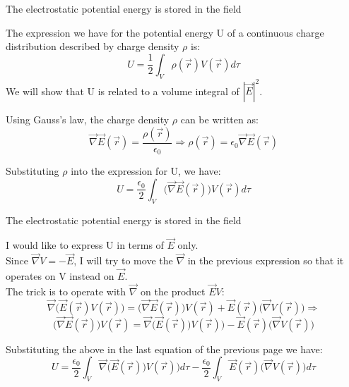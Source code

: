 \begin{frame}{The electrostatic potential energy is stored in the field}

The expression we have for the potential energy U of a continuous charge
distribution described by charge density $\rho$ is:
\begin{equation*}
   U = \frac{1}{2} \int_{V} \rho(\vec{r}) V(\vec{r}) d\tau
\end{equation*}
We will show that U is related to a volume integral of $|\vec{E}|^2$.\\

\vspace{0.3cm}

Using Gauss's law, the charge density $\rho$ can be written as:
\begin{equation*}
   \vec{\nabla} \vec{E}(\vec{r}) = \frac{\rho(\vec{r})}{\epsilon_0} \Rightarrow \rho(\vec{r}) = \epsilon_0 \vec{\nabla} \vec{E}(\vec{r})
\end{equation*}

Substituting $\rho$ into the expression for U, we have:
\begin{equation*}
   U = \frac{\epsilon_0}{2} \int_{V} \Big(\vec{\nabla} \vec{E}(\vec{r})\Big) V(\vec{r}) d\tau
\end{equation*}

\end{frame}

%
%
%

\begin{frame}{The electrostatic potential energy is stored in the field}

I would like to express U in terms of $\vec{E}$ only.\\
\vspace{0.2cm}
Since $\vec{\nabla} V = - \vec{E}$, I will try to move the $\vec{\nabla}$ in the previous
expression so that it operates on V instead on $\vec{E}$.\\
\vspace{0.2cm}
The trick is to operate with $\vec{\nabla}$ on the product $\vec{E} V$:
\begin{equation*}
  \vec{\nabla} \Big(\vec{E}(\vec{r}) V(\vec{r}) \Big) =
     \Big(\vec{\nabla} \vec{E}(\vec{r}) \Big) V(\vec{r}) + \vec{E}(\vec{r}) \Big(\vec{\nabla} V(\vec{r}) \Big) \Rightarrow
\end{equation*}
\begin{equation*}
   \Big(\vec{\nabla} \vec{E}(\vec{r}) \Big) V(\vec{r}) =
      \vec{\nabla} \Big(\vec{E}(\vec{r})) V(\vec{r}) \Big) - \vec{E}(\vec{r}) \Big(\vec{\nabla} V(\vec{r}) \Big)
\end{equation*}

Substituting the above in the last equation of the previous page we have:
\begin{equation*}
   U = \frac{\epsilon_0}{2} \int_{V} \vec{\nabla} \Big(\vec{E}(\vec{r})) V(\vec{r}) \Big) d\tau -
       \frac{\epsilon_0}{2} \int_{V} \vec{E}(\vec{r}) \Big(\vec{\nabla} V(\vec{r}) \Big)  d\tau
\end{equation*}

\end{frame}


